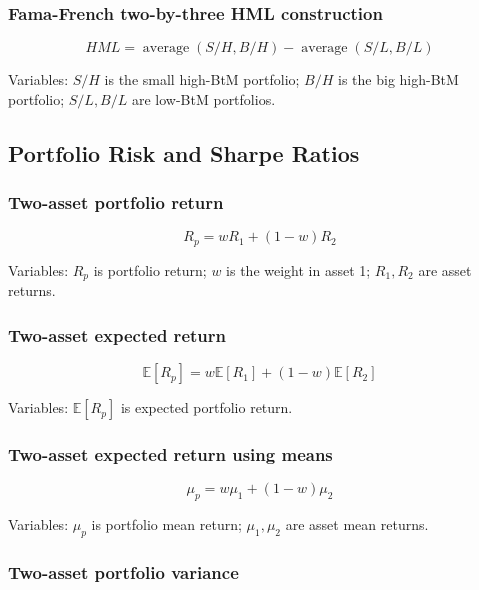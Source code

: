 \documentclass[
  8pt,
  twocolumn]{extarticle}
\begin{document}
\subsubsection{Fama-French two-by-three HML
construction}\label{fama-french-two-by-three-hml-construction}

\[
HML=\operatorname{average}(S/H,B/H)-\operatorname{average}(S/L,B/L)
\]

Variables: \(S/H\) is the small high-BtM portfolio; \(B/H\) is the big
high-BtM portfolio; \(S/L,B/L\) are low-BtM portfolios.

\subsection{Portfolio Risk and Sharpe
Ratios}\label{portfolio-risk-and-sharpe-ratios}

\subsubsection{Two-asset portfolio
return}\label{two-asset-portfolio-return}

\[
R_p=wR_1+(1-w)R_2
\]

Variables: \(R_p\) is portfolio return; \(w\) is the weight in asset 1;
\(R_1,R_2\) are asset returns.

\subsubsection{Two-asset expected
return}\label{two-asset-expected-return}

\[
\mathbb E[R_p]=w\mathbb E[R_1]+(1-w)\mathbb E[R_2]
\]

Variables: \(\mathbb E[R_p]\) is expected portfolio return.

\subsubsection{Two-asset expected return using
means}\label{two-asset-expected-return-using-means}

\[
\mu_p=w\mu_1+(1-w)\mu_2
\]

Variables: \(\mu_p\) is portfolio mean return; \(\mu_1,\mu_2\) are asset
mean returns.

\subsubsection{Two-asset portfolio
variance}\label{two-asset-portfolio-variance}
\end{document}
